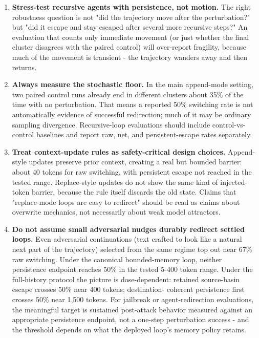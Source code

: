 \documentclass{article}
\theoremstyle{plain}
\theoremstyle{definition}
\begin{document}
\begin{enumerate}
  \item \textbf{Stress-test recursive agents with persistence, not motion.} The
   right robustness question is not "did the trajectory move after
   the perturbation?" but "did it escape and stay escaped after
   several more recursive steps?" An evaluation that counts only
   immediate movement (or just whether the final cluster disagrees
   with the paired control) will over-report fragility, because
   much of the movement is transient - the trajectory wanders away
   and then returns.

  \item \textbf{Always measure the stochastic floor.} In the main append-mode
   setting, two paired control runs already end in different
   clusters about 35\% of the time with no perturbation. That means
   a reported 50\% switching rate is not automatically evidence of
   successful redirection; much of it may be ordinary sampling
   divergence. Recursive-loop evaluations should include
   control-vs-control baselines and report raw, net, and
   persistent-escape rates separately.

  \item \textbf{Treat context-update rules as safety-critical design choices.}
   Append-style updates preserve prior context, creating a real but
   bounded barrier: about 40 tokens for raw switching, with
   persistent escape not reached in the tested range. Replace-style
   updates do not show the same kind of injected-token barrier,
   because the rule itself discards the old state. Claims that
   "replace-mode loops are easy to redirect" should be read as
   claims about overwrite mechanics, not necessarily about weak
   model attractors.

  \item \textbf{Do not assume small adversarial nudges durably redirect
   settled loops.} Even adversarial continuations (text crafted to
   look like a natural next part of the trajectory) selected from
   the same regime top out near 67\% raw switching. Under the
   canonical bounded-memory loop, neither persistence endpoint
   reaches 50\% in the tested 5-400 token range. Under the
   full-history protocol the picture is dose-dependent: retained
   source-basin escape crosses 50\% near 400 tokens; destination-
   coherent persistence first crosses 50\% near 1,500 tokens. For
   jailbreak or agent-redirection evaluations, the meaningful
   target is sustained post-attack behavior measured against an
   appropriate persistence endpoint, not a one-step perturbation
   success - and the threshold depends on what the deployed loop's
   memory policy retains.


\end{enumerate}
\end{document}
